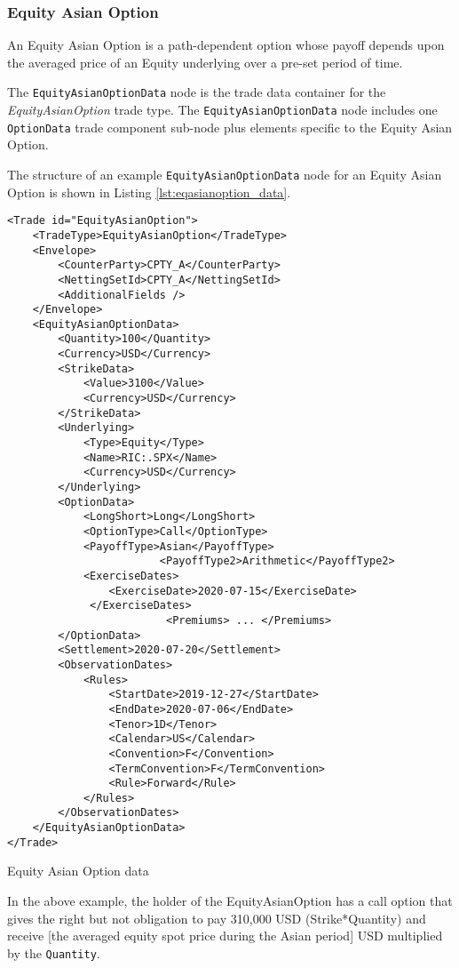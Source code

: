 \subsubsection{Equity Asian Option}

An Equity Asian Option is a path-dependent option whose payoff depends upon the averaged price of an
Equity underlying over a pre-set period of time.

The \lstinline!EquityAsianOptionData!  node is the trade data container for the \emph{EquityAsianOption} trade type. 
The \lstinline!EquityAsianOptionData!  node includes one  \lstinline!OptionData! trade component sub-node plus elements
specific to the Equity Asian Option. 

The structure of an example \lstinline!EquityAsianOptionData! node for an Equity Asian Option is shown in Listing
\ref{lst:eqasianoption_data}.

\begin{listing}[H]
	\begin{verbatim}
<Trade id="EquityAsianOption">
	<TradeType>EquityAsianOption</TradeType>
	<Envelope>
		<CounterParty>CPTY_A</CounterParty>
		<NettingSetId>CPTY_A</NettingSetId>
		<AdditionalFields />
	</Envelope>
	<EquityAsianOptionData>
		<Quantity>100</Quantity>
		<Currency>USD</Currency>
		<StrikeData>
			<Value>3100</Value>
			<Currency>USD</Currency>
		</StrikeData>
		<Underlying>
			<Type>Equity</Type>
			<Name>RIC:.SPX</Name>
			<Currency>USD</Currency>
		</Underlying>
		<OptionData>
			<LongShort>Long</LongShort>
			<OptionType>Call</OptionType>
			<PayoffType>Asian</PayoffType>
                        <PayoffType2>Arithmetic</PayoffType2>
			<ExerciseDates>
				<ExerciseDate>2020-07-15</ExerciseDate>
			 </ExerciseDates>
                         <Premiums> ... </Premiums>       
		</OptionData>
		<Settlement>2020-07-20</Settlement>
		<ObservationDates>
			<Rules>
				<StartDate>2019-12-27</StartDate>
				<EndDate>2020-07-06</EndDate>
				<Tenor>1D</Tenor>
				<Calendar>US</Calendar>
				<Convention>F</Convention>
				<TermConvention>F</TermConvention>
				<Rule>Forward</Rule>
			</Rules>
		</ObservationDates>
	</EquityAsianOptionData>
</Trade>
\end{verbatim}
\caption{Equity Asian Option data}
\label{lst:eqasianoption_data}
\end{listing}

In the above example, the holder of the EquityAsianOption has a call option that gives the right but not obligation to pay 310,000 USD (Strike*Quantity) and receive [the averaged equity spot price during the Asian period] USD multiplied by the \lstinline!Quantity!.  

